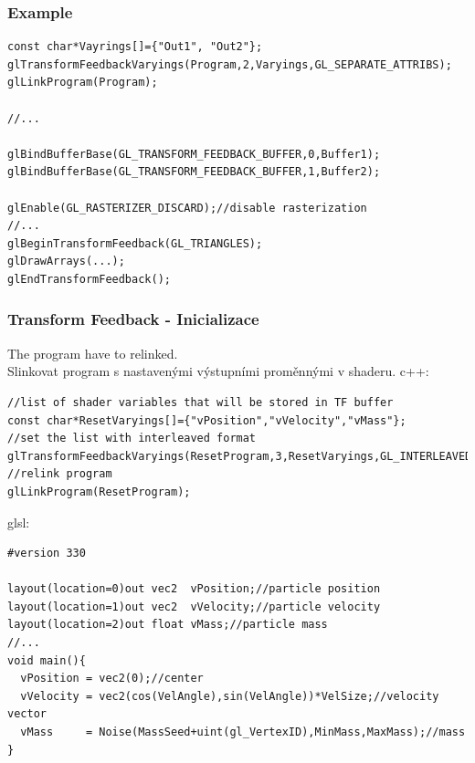 \begin{frame}[fragile]
\frametitle{Example}
	{\scriptsize
\begin{verbatim}
const char*Vayrings[]={"Out1", "Out2"};
glTransformFeedbackVaryings(Program,2,Varyings,GL_SEPARATE_ATTRIBS);
glLinkProgram(Program);

//...

glBindBufferBase(GL_TRANSFORM_FEEDBACK_BUFFER,0,Buffer1);
glBindBufferBase(GL_TRANSFORM_FEEDBACK_BUFFER,1,Buffer2);

glEnable(GL_RASTERIZER_DISCARD);//disable rasterization
//...
glBeginTransformFeedback(GL_TRIANGLES);
glDrawArrays(...);
glEndTransformFeedback();
	\end{verbatim}
	}
\end{frame}

\begin{frame}[fragile]
\frametitle{Transform Feedback - Inicializace}
  The program have to relinked.\\
	Slinkovat program s nastavenými výstupními proměnnými v shaderu.
	c++:
	{\scriptsize
\begin{verbatim}
//list of shader variables that will be stored in TF buffer
const char*ResetVaryings[]={"vPosition","vVelocity","vMass"};
//set the list with interleaved format
glTransformFeedbackVaryings(ResetProgram,3,ResetVaryings,GL_INTERLEAVED_ATTRIBS);
//relink program
glLinkProgram(ResetProgram);
	\end{verbatim}
	}
	glsl:
	{\scriptsize
\begin{verbatim}
#version 330

layout(location=0)out vec2  vPosition;//particle position
layout(location=1)out vec2  vVelocity;//particle velocity
layout(location=2)out float vMass;//particle mass
//...
void main(){
  vPosition = vec2(0);//center
  vVelocity = vec2(cos(VelAngle),sin(VelAngle))*VelSize;//velocity vector
  vMass     = Noise(MassSeed+uint(gl_VertexID),MinMass,MaxMass);//mass
}
	\end{verbatim}
	}
\end{frame}

